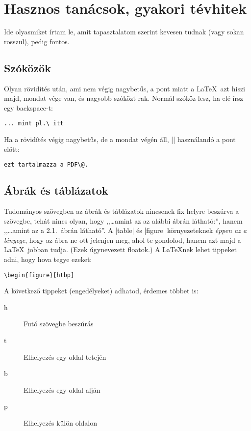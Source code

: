 \documentclass{scrartcl}
\theoremstyle{fineprint}
\begin{document}
\section{Hasznos tanácsok, gyakori tévhitek}
Ide olyasmiket írtam le, amit tapasztalatom szerint kevesen tudnak (vagy sokan rosszul), pedig fontos.
\subsection{Szóközök}
Olyan rövidítés után, ami nem végig nagybetűs, a pont miatt a \LaTeX\ azt hiszi majd, mondat vége van, és nagyobb szóközt rak. Normál szóköz lesz, ha elé írsz egy backspace-t:

\begin{lstlisting}
... mint pl.\ itt
\end{lstlisting}

Ha a rövidítés végig nagybetűs, de a mondat végén áll, |\@| használandó a pont előtt:

\begin{lstlisting}
ezt tartalmazza a PDF\@.
\end{lstlisting}

\subsection{Ábrák és táblázatok}
Tudományos szövegben az ábrák és táblázatok nincsenek fix helyre beszúrva a szövegbe, tehát nincs olyan, hogy ,,\ldots amint az az alábbi ábrán látható:'', hanem ,,\ldots amint az a 2.1.\ ábrán látható''. A |table| és |figure| környezeteknek \emph{éppen az a lényege}, hogy az ábra ne ott jelenjen meg, ahol te gondolod, hanem azt majd a \LaTeX\ jobban tudja. (Ezek úgynevezett floatok.) A \LaTeX\-nek lehet tippeket adni, hogy hova tegye ezeket:

\begin{lstlisting}
\begin{figure}[htbp]
\end{lstlisting}

A következő tippeket (engedélyeket) adhatod, érdemes többet is:
\begin{description}
\item[h] Futó szövegbe beszúrás
\item[t] Elhelyezés egy oldal tetején
\item[b] Elhelyezés egy oldal alján
\item[p] Elhelyezés külön oldalon
\end{description}
\end{document}
